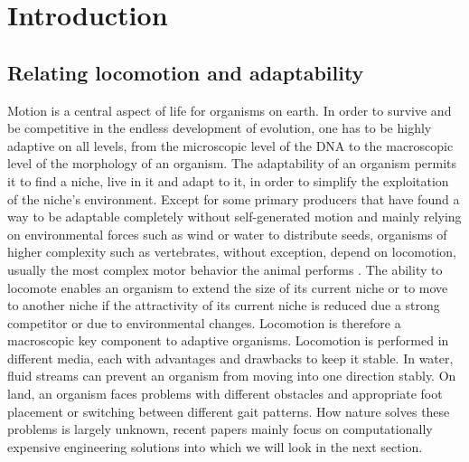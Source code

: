 \documentclass[main]{subfiles}
\begin{document}
\setcounter{chapter}{0}

\chapter{Introduction} %

\label{Chapter\thechapter} %


\section{Relating locomotion and adaptability}

Motion is a central aspect of life for organisms on earth. In order to survive and be competitive in the endless development of evolution, one has to be highly adaptive on all levels, from the microscopic level of the DNA to the macroscopic level of the morphology of an organism. The adaptability of an organism permits it to find a niche, live in it and adapt to it, in order to simplify the exploitation of the niche's environment. Except for some primary producers that have found a way to be adaptable completely without self-generated motion and mainly relying on environmental forces such as wind or water to distribute seeds, organisms of higher complexity such as vertebrates, without exception, depend on locomotion, usually the most complex motor behavior the animal performs \cite{bib:Grillner2000}. The ability to locomote enables an organism to extend the size of its current niche or to move to another niche if the attractivity of its current niche is reduced due a strong competitor or due to environmental changes. Locomotion is therefore a macroscopic key component to adaptive organisms. Locomotion is performed in different media, each with advantages and drawbacks to keep it stable. In water, fluid streams can prevent an organism from moving into one direction stably. On land, an organism faces problems with different obstacles and appropriate foot placement or switching between different gait patterns. How nature solves these problems is largely unknown, recent papers mainly focus on computationally expensive engineering solutions into which we will look in the next section.
\end{document}
